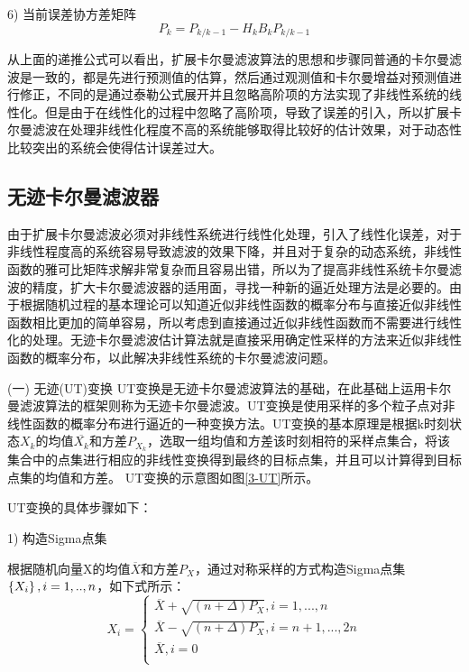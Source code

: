6) 当前误差协方差矩阵
\begin{equation}
{{P}_{k}}={{P}_{k/k-1}}-{{H}_{k}}{{B}_{k}}{{P}_{k/k-1}}
\end{equation}  

从上面的递推公式可以看出，扩展卡尔曼滤波算法的思想和步骤同普通的卡尔曼滤波是一致的，都是先进行预测值的估算，然后通过观测值和卡尔曼增益对预测值进行修正，不同的是通过泰勒公式展开并且忽略高阶项的方法实现了非线性系统的线性化。但是由于在线性化的过程中忽略了高阶项，导致了误差的引入，所以扩展卡尔曼滤波在处理非线性化程度不高的系统能够取得比较好的估计效果，对于动态性比较突出的系统会使得估计误差过大。
\subsection{无迹卡尔曼滤波器}
由于扩展卡尔曼滤波必须对非线性系统进行线性化处理，引入了线性化误差，对于非线性程度高的系统容易导致滤波的效果下降，并且对于复杂的动态系统，非线性函数的雅可比矩阵求解非常复杂而且容易出错，所以为了提高非线性系统卡尔曼滤波的精度，扩大卡尔曼滤波器的适用面，寻找一种新的逼近处理方法是必要的。由于根据随机过程的基本理论可以知道近似非线性函数的概率分布与直接近似非线性函数相比更加的简单容易，所以考虑到直接通过近似非线性函数而不需要进行线性化的处理。无迹卡尔曼滤波估计算法就是直接采用确定性采样的方法来近似非线性函数的概率分布，以此解决非线性系统的卡尔曼滤波问题。

(一)	无迹(UT)变换
	UT变换是无迹卡尔曼滤波算法的基础，在此基础上运用卡尔曼滤波算法的框架则称为无迹卡尔曼滤波。UT变换是使用采样的多个粒子点对非线性函数的概率分布进行逼近的一种变换方法。UT变换的基本原理是根据k时刻状态${{X}_{k}}$的均值$\overline{{{X}_{k}}}$和方差${{P}_{{{X}_{k}}}}$，选取一组均值和方差该时刻相符的采样点集合，将该集合中的点集进行相应的非线性变换得到最终的目标点集，并且可以计算得到目标点集的均值和方差。 UT变换的示意图如图\ref{3-UT}所示。

UT变换的具体步骤如下：

1) 构造Sigma点集

根据随机向量X的均值$\overline{X}$和方差${{P}_{X}}$，通过对称采样的方式构造Sigma点集 $\left\{ {{X}_{i}} \right\}\\,i=1,..,n$，如下式所示：
\begin{equation}\label{3-24}
{{X}_{i}}=\left\{ \begin{array}{l}
   \overline{X}+\sqrt{(n+\Delta ){{P}_{X}}},i=1,...,n \\ 
  \overline{X}-\sqrt{(n+\Delta ){{P}_{X}}},i=n+1,...,2n \\ 
  \overline{X},i=0 \\ 
\end{array} \right.
\end{equation}  


